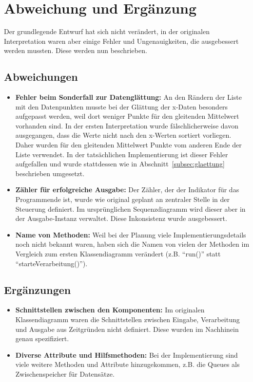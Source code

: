 \chapter{Abweichung und Ergänzung}\label{ch:abweichung-und-ergaenzung}
Der grundlegende Entwurf hat sich nicht verändert, in der originalen Interpretation waren aber einige Fehler und Ungenauigkeiten, die ausgebessert werden mussten.
Diese werden nun beschrieben.

\section{Abweichungen}\label{sec:abweich}

\begin{itemize}[noitemsep]
    \item \textbf{Fehler beim Sonderfall zur Datenglättung:} An den Rändern der Liste mit den Datenpunkten musste bei der Glättung der x-Daten besonders aufgepasst werden, weil dort weniger Punkte für den gleitenden Mittelwert vorhanden sind.
    In der ersten Interpretation wurde fälschlicherweise davon ausgegangen, dass die Werte nicht nach den x-Werten sortiert vorliegen.
    Daher wurden für den gleitenden Mittelwert Punkte vom anderen Ende der Liste verwendet.
    In der tatsächlichen Implementierung ist dieser Fehler aufgefallen und wurde stattdessen wie in Abschnitt~\ref{subsec:glaettung} beschrieben umgesetzt.
    \item \textbf{Zähler für erfolgreiche Ausgabe:} Der Zähler, der der Indikator für das Programmende ist, wurde wie original geplant an zentraler Stelle in der Steuerung definiert.
    Im ursprünglichen Sequenzdiagramm wird dieser aber in der Ausgabe-Instanz verwaltet.
    Diese Inkonsistenz wurde ausgebessert.
    \item \textbf{Name von Methoden:} Weil bei der Planung viele Implementierungsdetails noch nicht bekannt waren, haben sich die Namen von vielen der Methoden im Vergleich zum ersten Klassendiagramm verändert (z.B. \enquote{run()} statt \enquote{starteVerarbeitung()}).
\end{itemize}

\section{Ergänzungen}\label{sec:erg}

\begin{itemize}
    \item \textbf{Schnittstellen zwischen den Komponenten:} Im originalen Klassendiagramm waren die Schnittstellen zwischen Eingabe, Verarbeitung und Ausgabe aus Zeitgründen nicht definiert.
    Diese wurden im Nachhinein genau spezifiziert.
    \item \textbf{Diverse Attribute und Hilfsmethoden:} Bei der Implementierung sind viele weitere Methoden und Attribute hinzugekommen, z.B. die Queues als Zwischenspeicher für Datensätze.
\end{itemize}
